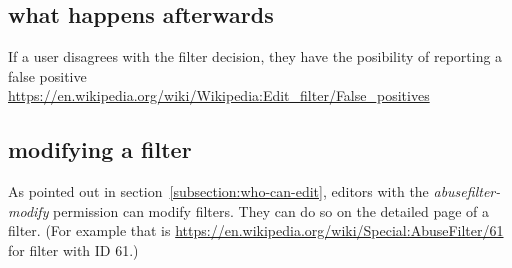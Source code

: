 \documentclass{sigchi}
\begin{document}

\subsection{what happens afterwards}

If a user disagrees with the filter decision, they have the posibility of reporting a false positive
\url{https://en.wikipedia.org/wiki/Wikipedia:Edit_filter/False_positives}

\subsection{modifying a filter}

As pointed out in section~\ref{subsection:who-can-edit}, editors with the \emph{abusefilter-modify} permission can modify filters.
They can do so on the detailed page of a filter.
(For example that is \url{https://en.wikipedia.org/wiki/Special:AbuseFilter/61} for filter with ID 61.)
\end{document}
